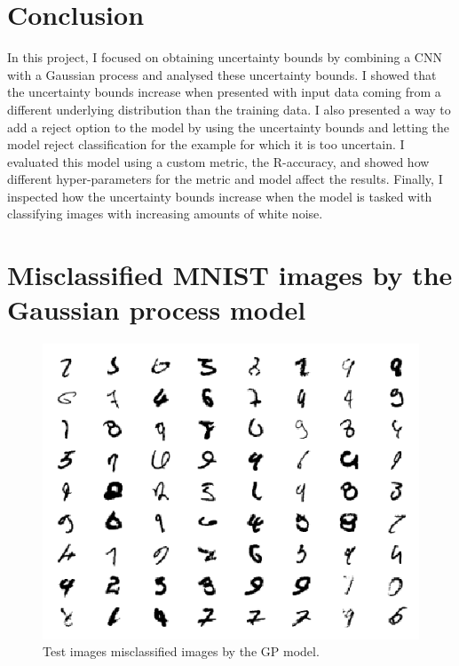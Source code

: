 \documentclass{article}
\begin{document}
\section{Conclusion}
In this project, I focused on obtaining uncertainty bounds by combining a CNN with a Gaussian process and analysed these uncertainty bounds. I showed that the uncertainty bounds increase when presented with input data coming from a different underlying distribution than the training data. I also presented a way to add a reject option to the model by using the uncertainty bounds and letting the model reject classification for the example for which it is too uncertain. I evaluated this model using a custom metric, the R-accuracy, and showed how different hyper-parameters for the metric and model affect the results. Finally, I inspected how the uncertainty bounds increase when the model is tasked with classifying images with increasing amounts of white noise.




\newpage
\appendix 
\section{Misclassified MNIST images by the Gaussian process model}
\label{appendix/mnist_error}

\begin{figure}[h]
	\centering
	\includegraphics[scale=1.1]{incorrect_mnist}
	\caption{Test images misclassified images by the GP model.}
	\label{fig/incorrect_mnist}
\end{figure}
\end{document}
